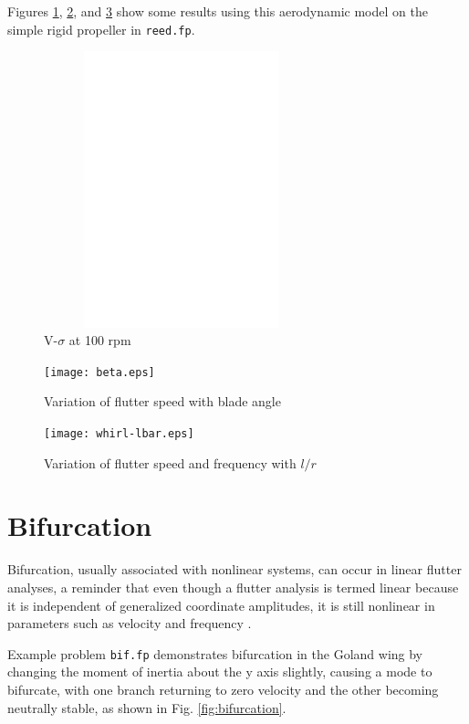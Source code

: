 \documentclass[11pt,openany,twoside]{book}
\numberwithin{equation}{section}		%
\newcommand{\Code}[1]{{\small\tt #1}}
\newcommand{\Figref}[1]{Fig. \ref{#1}}  %
\begin{document}
Figures \ref{fig:whirl-vso}, \ref{fig:beta}, and \ref{fig:whirl-lbar}
show some results using this aerodynamic model on the simple rigid
propeller in \Code{reed.fp}.
\begin{figure}[hbt!]
	\includegraphics[height=8.0cm,width=8.0cm]{whirl-vso.eps}
	\centering
	\caption{V-$\sigma$ at 100 rpm}\label{fig:whirl-vso}
\end{figure}

\begin{figure}[hbt!]
	\texttt{[image: beta.eps]}
\centering
\caption{Variation of flutter speed with blade angle}\label{fig:beta}
\end{figure}

\begin{figure}[hbt!]
	\texttt{[image: whirl-lbar.eps]}
\centering
\caption{Variation of flutter speed and frequency with $l/r$}\label{fig:whirl-lbar}
\end{figure}

\clearpage
\pagebreak

\section{Bifurcation}\label{ex:bifurcation}
Bifurcation, usually associated with nonlinear systems, can occur in
linear flutter analyses, a reminder that even though a flutter analysis
is termed linear because it is independent of generalized coordinate
amplitudes, it is still nonlinear in parameters such as velocity and frequency
\cite{meyer2015continuation}.

Example problem \Code{bif.fp} demonstrates bifurcation in the Goland wing
by changing the moment of inertia about the y axis slightly, causing a
mode to bifurcate, with one branch returning to zero velocity and the
other becoming neutrally stable, as shown in \Figref{fig:bifurcation}.
\end{document}
